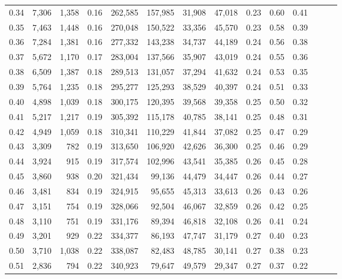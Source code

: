 \begin{tabular}{rrrrrrrrrrrrrr}
0.34 &   7,306 &  1,358 &  0.16 &  262,585 &  157,985 &  31,908 &  47,018 &  0.23 &  0.60 &      0.41 \\
0.35 &   7,463 &  1,448 &  0.16 &  270,048 &  150,522 &  33,356 &  45,570 &  0.23 &  0.58 &      0.39 \\
0.36 &   7,284 &  1,381 &  0.16 &  277,332 &  143,238 &  34,737 &  44,189 &  0.24 &  0.56 &      0.38 \\
0.37 &   5,672 &  1,170 &  0.17 &  283,004 &  137,566 &  35,907 &  43,019 &  0.24 &  0.55 &      0.36 \\
0.38 &   6,509 &  1,387 &  0.18 &  289,513 &  131,057 &  37,294 &  41,632 &  0.24 &  0.53 &      0.35 \\
0.39 &   5,764 &  1,235 &  0.18 &  295,277 &  125,293 &  38,529 &  40,397 &  0.24 &  0.51 &      0.33 \\
0.40 &   4,898 &  1,039 &  0.18 &  300,175 &  120,395 &  39,568 &  39,358 &  0.25 &  0.50 &      0.32 \\
0.41 &   5,217 &  1,217 &  0.19 &  305,392 &  115,178 &  40,785 &  38,141 &  0.25 &  0.48 &      0.31 \\
0.42 &   4,949 &  1,059 &  0.18 &  310,341 &  110,229 &  41,844 &  37,082 &  0.25 &  0.47 &      0.29 \\
0.43 &   3,309 &    782 &  0.19 &  313,650 &  106,920 &  42,626 &  36,300 &  0.25 &  0.46 &      0.29 \\
0.44 &   3,924 &    915 &  0.19 &  317,574 &  102,996 &  43,541 &  35,385 &  0.26 &  0.45 &      0.28 \\
0.45 &   3,860 &    938 &  0.20 &  321,434 &   99,136 &  44,479 &  34,447 &  0.26 &  0.44 &      0.27 \\
0.46 &   3,481 &    834 &  0.19 &  324,915 &   95,655 &  45,313 &  33,613 &  0.26 &  0.43 &      0.26 \\
0.47 &   3,151 &    754 &  0.19 &  328,066 &   92,504 &  46,067 &  32,859 &  0.26 &  0.42 &      0.25 \\
0.48 &   3,110 &    751 &  0.19 &  331,176 &   89,394 &  46,818 &  32,108 &  0.26 &  0.41 &      0.24 \\
0.49 &   3,201 &    929 &  0.22 &  334,377 &   86,193 &  47,747 &  31,179 &  0.27 &  0.40 &      0.23 \\
0.50 &   3,710 &  1,038 &  0.22 &  338,087 &   82,483 &  48,785 &  30,141 &  0.27 &  0.38 &      0.23 \\
0.51 &   2,836 &    794 &  0.22 &  340,923 &   79,647 &  49,579 &  29,347 &  0.27 &  0.37 &      0.22 \\

\end{tabular}
